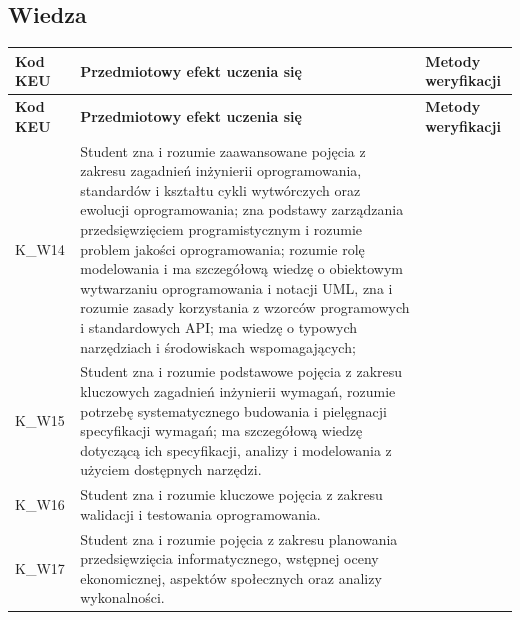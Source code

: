 \documentclass[12pt, a4paper]{article}
\newcommand{\thdrule}{\noalign{\global\setlength{\extrarowheight}{0pt}}}
\newcommand{\thdend}{\noalign{\global\setlength{\extrarowheight}{3pt}}}
\begin{document}
\subsection*{Wiedza}
{\scriptsize
\begin{longtable}{m{1.6cm}m{9.0cm}m{4.2cm}}
\thdrule\toprule
\rowcolor{pjatkRed} {\color{white}\footnotesize\textbf{\vphantom{Ag}Kod KEU}} & {\color{white}\footnotesize\textbf{\vphantom{Ag}Przedmiotowy efekt uczenia się}} & {\color{white}\footnotesize\textbf{\vphantom{Ag}Metody weryfikacji}} \\
\midrule\thdend
\endfirsthead
\thdrule\toprule
\rowcolor{pjatkRed} {\color{white}\footnotesize\textbf{\vphantom{Ag}Kod KEU}} & {\color{white}\footnotesize\textbf{\vphantom{Ag}Przedmiotowy efekt uczenia się}} & {\color{white}\footnotesize\textbf{\vphantom{Ag}Metody weryfikacji}} \\
\midrule\thdend
\endhead
  \rowcolor{tableRowLight} K\_W14 & Student zna i rozumie zaawansowane pojęcia z zakresu zagadnień inżynierii oprogramowania, standardów i kształtu cykli wytwórczych oraz ewolucji oprogramowania; zna podstawy zarządzania przedsięwzięciem programistycznym i rozumie problem jakości oprogramowania; rozumie rolę modelowania i ma szczegółową wiedzę o obiektowym wytwarzaniu oprogramowania i notacji UML, zna i rozumie zasady korzystania z wzorców programowych i standardowych API; ma wiedzę o typowych narzędziach i środowiskach wspomagających; &  \\
  \rowcolor{tableRowAlt} K\_W15 & Student zna i rozumie podstawowe pojęcia z zakresu kluczowych zagadnień inżynierii wymagań, rozumie potrzebę systematycznego budowania i pielęgnacji specyfikacji wymagań; ma szczegółową wiedzę dotyczącą ich specyfikacji, analizy i modelowania z użyciem dostępnych narzędzi. &  \\
  \rowcolor{tableRowLight} K\_W16 & Student zna i rozumie kluczowe pojęcia z zakresu walidacji i testowania oprogramowania. &  \\
  \rowcolor{tableRowAlt} K\_W17 & Student zna i rozumie pojęcia z zakresu planowania przedsięwzięcia informatycznego, wstępnej oceny ekonomicznej, aspektów społecznych oraz analizy wykonalności. &  \\
\bottomrule
\end{longtable}}
\end{document}

